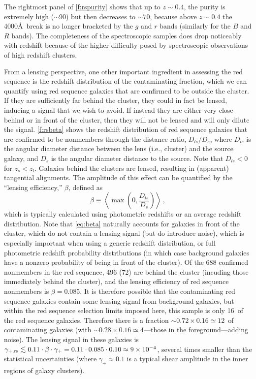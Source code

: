 The rightmost panel of \cref{f:rspurity} shows that up to $z\sim0.4$, the purity is extremely high 
($\sim$90\percent) but then decreases to $\sim\!70$\percent, because above $z\sim0.4$ the 4000\AA\ break 
is no longer bracketed by the $g$ and $r$ bands (similarly for the $B$ and $R$ bands). The 
completeness of the spectroscopic samples does drop noticeably with redshift because of the higher 
difficulty posed by spectroscopic observations of high redshift clusters.

From a lensing perspective, one other important ingredient in assessing the red sequence is the 
redshift distribution of the contaminating fraction, which we can quantify using red sequence 
galaxies that are confirmed to be outside the cluster. If they are sufficiently far behind the 
cluster, they could in fact be lensed, inducing a signal that we wish to avoid. If instead they are 
either very close behind or in front of the cluster, then they will not be lensed and will only 
dilute the signal. \cref{f:rsbeta} shows the redshift distribution of red sequence galaxies 
that are confirmed to be nonmembers through the distance ratio, $D_{ls}/D_s$, where $D_{ls}$ is 
the angular diameter distance between the lens (i.e., cluster) and the source galaxy, and $D_s$ is 
the angular diameter distance to the source. Note that $D_{ls}<0$ for $z_s<z_l$. Galaxies behind 
the clusters are lensed, resulting in (apparent) tangential alignments. The amplitude of this 
effect can be quantified by the ``lensing efficiency,'' $\beta$, defined as
\begin{equation}\label{eq:beta}
 \beta \equiv \left\langle\max\left(0, \frac{D_{ls}}{D_s}\right)\right\rangle\,,
\end{equation}
which is typically calculated using photometric redshifts or an average redshift distribution. Note 
that \cref{eq:beta} naturally accounts for galaxies in front of the cluster, which do not contain a 
lensing signal (but do introduce noise), which is especially important when using a generic 
redshift 
distribution, or full photometric redshift probability distributions (in which case background 
galaxies have a nonzero probability of being in front of the cluster). Of the 688 confirmed 
nonmembers in the red sequence, 496 (72\percent) are behind the cluster (incuding those immediately 
behind 
the cluster), and the lensing efficiency of red sequence nonmembers is $\beta=0.085$. It is 
therefore possible that the contaminating red sequence galaxies contain some lensing signal from 
background galaxies, but within the red sequence selection limits imposed here, this sample is only 
16\percent\ of the red sequence galaxies. Therefore there is a fraction $\sim\!0.72\times0.16\simeq12$\percent\ 
of 
contaminating galaxies (with $\sim\!0.28\times0.16\simeq4$\percent---those in the foreground---adding 
noise). The lensing signal in these galaxies is $\gamma_{+,\rm rs} \lesssim 
0.11\cdot\beta\cdot\gamma_+ = 0.11\cdot0.085\cdot0.10\approx9\times10^{-4}$, several times smaller 
than the statistical uncertainties (where $\gamma_+\approx0.1$ is a typical shear amplitude in the 
inner regions of galaxy clusters).

